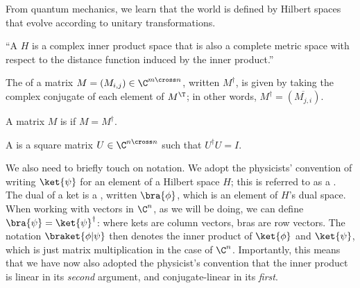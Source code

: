 From quantum mechanics, we learn that the world is defined by Hilbert spaces
that evolve according to unitary transformations.

\begin{definition}\label{def:hilbert-space}
    ``A  $H$ is a complex
  inner product space that is also a complete metric space with respect to the
  distance function induced by the inner product.''
\end{definition}

\begin{definition}\label{def:conjugate-transpose}
  The  of a matrix $M = (M_{i,j}) \in \C^{m \cross
  n}$, written $M^\dag$, is given by taking the complex conjugate of each
  element of $M^\T$; in other words, $M^\dag = (\overline{M_{j,i}})$.
\end{definition}

\begin{definition}\label{def:hermitian}
  A matrix $M$ is  if $M = M^\dag$.
\end{definition}

\begin{definition}\label{def:unitary-matrix}
  A  is a square matrix $U \in \C^{n \cross n}$ such that
  $U^\dag U = I$.
\end{definition}

We also need to briefly touch on notation.  We adopt the physicists' convention
of writing $\ket{\psi}$ for an element of a Hilbert space $H$; this is referred
to as a .  The dual of a ket is a , written $\bra{\phi}$,
which is an element of $H$'s dual space.  When working with vectors in $\C^n$,
as we will be doing, we can define $\bra{\psi} = \ket{\psi}^\dag$: where kets
are column vectors, bras are row vectors.  The notation $\braket{\phi | \psi}$
then denotes the inner product of $\ket{\phi}$ and $\ket{\psi}$, which is just
matrix multiplication in the case of $\C^n$.  Importantly, this means that we
have now also adopted the physicist's convention that the inner product is
linear in its \emph{second} argument, and conjugate-linear in its \emph{first}.

